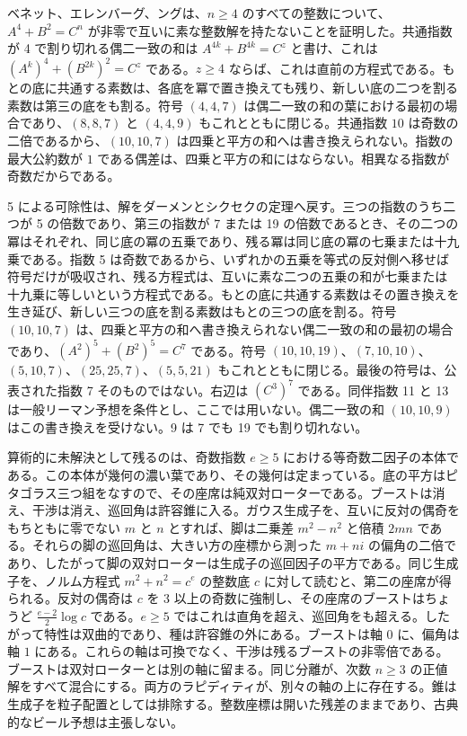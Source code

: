 \documentclass[a4paper]{article}
\theoremstyle{definition}
\theoremstyle{remark}
\begin{document}
ベネット、エレンバーグ、ングは、\( n\ge 4 \) のすべての整数について、\( A^4+B^2=C^n \) が非零で互いに素な整数解を持たないことを証明した。共通指数が 4 で割り切れる偶二一致の和は \( A^{4k}+B^{4k}=C^z \) と書け、これは \( (A^k)^4+(B^{2k})^2=C^z \) である。\( z\ge 4 \) ならば、これは直前の方程式である。もとの底に共通する素数は、各底を冪で置き換えても残り、新しい底の二つを割る素数は第三の底をも割る。符号 \( (4,4,7) \) は偶二一致の和の葉における最初の場合であり、\( (8,8,7) \) と \( (4,4,9) \) もこれとともに閉じる。共通指数 \( 10 \) は奇数の二倍であるから、\( (10,10,7) \) は四乗と平方の和へは書き換えられない。指数の最大公約数が \( 1 \) である偶差は、四乗と平方の和にはならない。相異なる指数が奇数だからである。

5 による可除性は、解をダーメンとシクセクの定理へ戻す。三つの指数のうち二つが 5 の倍数であり、第三の指数が 7 または 19 の倍数であるとき、その二つの冪はそれぞれ、同じ底の冪の五乗であり、残る冪は同じ底の冪の七乗または十九乗である。指数 5 は奇数であるから、いずれかの五乗を等式の反対側へ移せば符号だけが吸収され、残る方程式は、互いに素な二つの五乗の和が七乗または十九乗に等しいという方程式である。もとの底に共通する素数はその置き換えを生き延び、新しい三つの底を割る素数はもとの三つの底を割る。符号 \( (10,10,7) \) は、四乗と平方の和へ書き換えられない偶二一致の和の最初の場合であり、\( (A^2)^5+(B^2)^5=C^7 \) である。符号 \( (10,10,19) \)、\( (7,10,10) \)、\( (5,10,7) \)、\( (25,25,7) \)、\( (5,5,21) \) もこれとともに閉じる。最後の符号は、公表された指数 7 そのものではない。右辺は \( (C^3)^7 \) である。同伴指数 11 と 13 は一般リーマン予想を条件とし、ここでは用いない。偶二一致の和 \( (10,10,9) \) はこの書き換えを受けない。9 は 7 でも 19 でも割り切れない。

算術的に未解決として残るのは、奇数指数 \( e\ge 5 \) における等奇数二因子の本体である。この本体が幾何の濃い葉であり、その幾何は定まっている。底の平方はピタゴラス三つ組をなすので、その座席は純双対ローターである。ブーストは消え、干渉は消え、巡回角は許容錐に入る。ガウス生成子を、互いに反対の偶奇をもちともに零でない \( m \) と \( n \) とすれば、脚は二乗差 \( m^2-n^2 \) と倍積 \( 2mn \) である。それらの脚の巡回角は、大きい方の座標から測った \( m+ni \) の偏角の二倍であり、したがって脚の双対ローターは生成子の巡回因子の平方である。同じ生成子を、ノルム方程式 \( m^2+n^2=c^e \) の整数底 \( c \) に対して読むと、第二の座席が得られる。反対の偶奇は \( c \) を \( 3 \) 以上の奇数に強制し、その座席のブーストはちょうど \( \frac{e-2}{2}\log c \) である。\( e\ge 5 \) ではこれは直角を超え、巡回角をも超える。したがって特性は双曲的であり、種は許容錐の外にある。ブーストは軸 \( 0 \) に、偏角は軸 \( 1 \) にある。これらの軸は可換でなく、干渉は残るブーストの非零倍である。ブーストは双対ローターとは別の軸に留まる。同じ分離が、次数 \( n\ge 3 \) の正値解をすべて混合にする。両方のラピディティが、別々の軸の上に存在する。錐は生成子を粒子配置としては排除する。整数座標は開いた残差のままであり、古典的なビール予想は主張しない。
\end{document}
